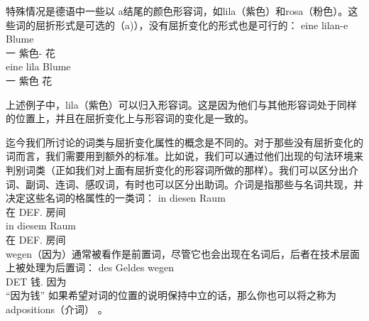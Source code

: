 特殊情况是德语中一些以 a结尾的颜色形容词，如lila（紫色）和rosa（粉色）。这些词的屈折形式是可选的（a)），没有屈折变化的形式也是可行的：
\eal
\ex 
\gll eine lilan-e Blume\\
	 一 紫色-\fem{} 花\\
\ex 
\gll eine lila Blume\\
	 一 紫色 花\\
\zl

\noindent
上述例子中，lila（紫色）可以归入形容词。这是因为他们与其他形容词处于同样的位置上，并且在屈折变化上与形容词的变化是一致的。

迄今我们所讨论的词类与屈折变化属性的概念是不同的。对于那些没有屈折变化的词而言，我们需要用到额外的标准。比如说，我们可以通过他们出现的句法环境来判别词类（正如我们对上面有屈折变化的形容词所做的那样）。我们可以区分出介词、副词、连词、感叹词，有时也可以区分出助词。介词是指那些与名词共现，并决定这些名词的格属性的一类词：
\eal
\ex 
\gll in diesen Raum\\
	 在 DEF.\acc{} 房间\\
\ex 
\gll in diesem Raum\\
	 在 DEF.\dat{} 房间\\
\zl
wegen（因为）通常被看作是前置词，尽管它也会出现在名词后，后者在技术层面上被处理为后置词：
\ea
\gll des Geldes wegen\\
	 DET 钱.\gen{} 因为\\
\glt “因为钱”
\z
如果希望对词的位置的说明保持中立的话，那么你也可以将之称为adpositions（介词） 。

